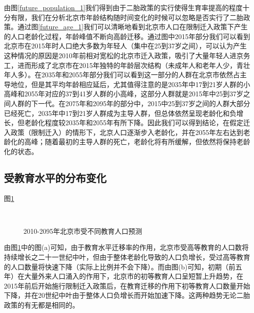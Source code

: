 \documentclass[a4paper]{article}
\begin{document}
由图\ref{future_population_1}我们得到由于二胎政策的实行使得生育率提高的程度十分有限，我们在分析北京市年龄结构随时间变化的时候可以忽略是否实行了二胎政策。通过图\ref{future_age_1}我们可以清晰地看到北京市人口在限制迁入政策下产生的人口老龄化过程，年龄峰值不断向高龄迁移。通过图中2015年部分我们可以看到北京市在2015年时人口绝大多数为年轻人（集中在25到37岁之间），可以认为产生这种情况的原因是2010年前相对宽松的北京市迁入政策，吸引了大量年轻人进京务工，进而形成了北京市在2015年独特的年龄层次结构（未成年人和老年人少，青壮年人多）。在2035年和2055年部分我们可以看到这一部分的人群在北京市依然占主导地位，但是其平均年龄相应延后，尤其值得注意的是2035年中17到21岁人群的小高峰和2055年对应的37到41岁人群的小高峰，这部分人群就是2015年中25到37岁之间人群的下一代。在2075年和2095年的部分中，2015中25到37岁之间的人群大部分已经死亡，2035年中17到21岁人群成为主导人群，但总体依然呈现老龄化和负增长，但老龄化程度较2035年和2055年有所下降。因此我们可以得到结论，在假定迁入政策（限制迁入）的情形下，北京人口逐渐步入老龄化，并在2055年左右达到老龄化的高峰；随着最初的主导人群的死亡，老龄化将有所缓解，但依然将保持老龄化的状态。
\subsection{受教育水平的分布变化}
图\ref{future_edu_pri_sen}
	\begin{figure}
		\centering
		\caption{2010-2095年北京市受不同教育人口预测}
		 \\
		\label{future_edu_pri_sen}
	\end{figure}
由图\ref{future_edu_pri_sen}中的图(a)可知，由于教育水平迁移率的作用，北京市受高等教育的人口数将持续增长之二十一世纪中叶，但由于整体老龄化导致的人口负增长，受过高等教育的人口数量将快速下降（实际上比例并不会下降）。而由图(b)可知，初期（前五年）在大量外来人口涌入的作用下，北京市的初等教育人口呈短暂上升趋势，在2015年前后开始施行限制迁入政策后，在教育迁移的作用下初等教育人口数量开始下降，并在20世纪中叶由于整体人口负增长而开始加速下降。这两种趋势无论二胎政策的有无都是相同的。
\end{document}
